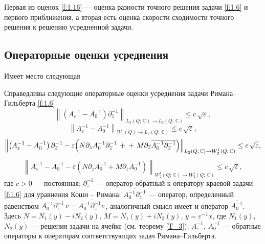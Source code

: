 Первая из оценок \eqref{f:1.16} --- оценка разности точного решения задачи \eqref{f:1.6}  и первого приближения, а вторая есть оценка скорости сходимости точного решения к решению усредненной задачи.

\subsection{Операторные оценки  усреднения}\label{OPOC}
 Имеет место следующая

\begin{theorem}\label{T_5}
Справедливы следующие операторные оценки усреднения задачи Римана--Гильберта \eqref{f:1.6}
\begin{equation}\label{1.15}
\left\|\left(A_\varepsilon^{-1}-A_0^{-1}\right)\partial_{\overline z}^{-1}\right\|_{L_2(Q;\,\mathbb{C})\to L_2(Q;\,\mathbb{C})}
\leq c\,\sqrt\varepsilon,
\end{equation}
\begin{equation}\label{1.16}
\left\|A_\varepsilon^{-1}-A_0^{-1}\right\|_{W_0(Q)\to L_2(Q;\,\mathbb{C})}
\leq c\,\sqrt\varepsilon,
\end{equation}
\begin{equation}\label{1.17}
\left\|\left(A_\varepsilon^{-1}-A_0^{-1}\right)\partial_{\overline z}^{-1}-\varepsilon\Big(N
\partial_zA_0^{-1}
\partial_{\overline z}^{-1}\right.+\\
+\left.M\partial_{\overline z}\overline{A_0^{-1}\partial_{\overline z}^{-1}}\Big)
\right\|_{L_2(Q;\,\mathbb{C})\to W^1_2(Q;\,\mathbb{C})}
\leq c\,\sqrt\varepsilon,
\end{equation}
\vspace{-7mm}
\begin{equation}\label{1.18}
\left\|A_\varepsilon^{-1}-A_0^{-1}-\varepsilon\left(N\partial_zA_0^{-1}
+M\partial_{\overline z}\overline{A_0^{-1}}\right)
\right\|_{W^1_2(Q;\,\mathbb{C})\to W^1_2(Q;\,\mathbb{C})}
\leq c\,\sqrt\varepsilon,
\end{equation}
где $c>0$ --- постоянная; $\partial_{\overline z}^{-1}$ --- оператор обратный к
оператору краевой задачи
\eqref{f:1.6} для уравнения Коши -- Римана;
$\overline{A_0^{-1}\partial_{\overline z}^{-1}}$ --- оператор,
определенный равенством $\overline{A_0^{-1}\partial_{\overline z}^{-1}}{\,v}=\overline{A_0^{-1}\partial_{\overline z}^{-1}{v\,}}$,
аналогичный смысл имеет и оператор $\overline{A_0^{-1}}$. Здесь
$N=N_1(y)-iN_2(y)$, $M=N_1(y)+iN_2(y)$, $y=\varepsilon^{-1}x$,  где $N_1(y)$, $N_2(y)$ --- решения задачи
на ячейке (см. теорему \ref{T_3}); $A_\varepsilon^{-1}$, $A_0^{-1}$
--- обратные операторы к операторам соответствующих  задач Римана--Гильберта.
\end{theorem}


